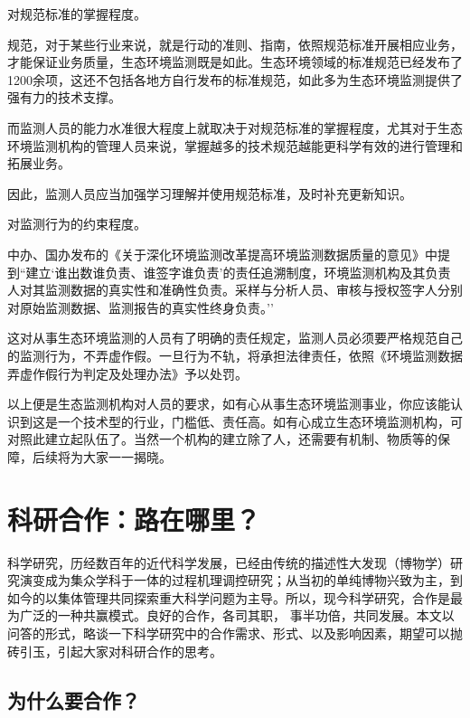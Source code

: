 \documentclass[]{book}
\begin{document}
对规范标准的掌握程度。

规范，对于某些行业来说，就是行动的准则、指南，依照规范标准开展相应业务，才能保证业务质量，生态环境监测既是如此。生态环境领域的标准规范已经发布了1200余项，这还不包括各地方自行发布的标准规范，如此多为生态环境监测提供了强有力的技术支撑。

而监测人员的能力水准很大程度上就取决于对规范标准的掌握程度，尤其对于生态环境监测机构的管理人员来说，掌握越多的技术规范越能更科学有效的进行管理和拓展业务。

因此，监测人员应当加强学习理解并使用规范标准，及时补充更新知识。

对监测行为的约束程度。

中办、国办发布的《关于深化环境监测改革提高环境监测数据质量的意见》中提到``建立`谁出数谁负责、谁签字谁负责'的责任追溯制度，环境监测机构及其负责人对其监测数据的真实性和准确性负责。采样与分析人员、审核与授权签字人分别对原始监测数据、监测报告的真实性终身负责。''

这对从事生态环境监测的人员有了明确的责任规定，监测人员必须要严格规范自己的监测行为，不弄虚作假。一旦行为不轨，将承担法律责任，依照《环境监测数据弄虚作假行为判定及处理办法》予以处罚。

以上便是生态监测机构对人员的要求，如有心从事生态环境监测事业，你应该能认识到这是一个技术型的行业，门槛低、责任高。如有心成立生态环境监测机构，可对照此建立起队伍了。当然一个机构的建立除了人，还需要有机制、物质等的保障，后续将为大家一一揭晓。

\hypertarget{ux79d1ux7814ux5408ux4f5cux8defux5728ux54eaux91cc}{%
\section{科研合作：路在哪里？}\label{ux79d1ux7814ux5408ux4f5cux8defux5728ux54eaux91cc}}

科学研究，历经数百年的近代科学发展，已经由传统的描述性大发现（博物学）研究演变成为集众学科于一体的过程机理调控研究；从当初的单纯博物兴致为主，到如今的以集体管理共同探索重大科学问题为主导。所以，现今科学研究，合作是最为广泛的一种共赢模式。良好的合作，各司其职， 事半功倍，共同发展。本文以问答的形式，略谈一下科学研究中的合作需求、形式、以及影响因素，期望可以抛砖引玉，引起大家对科研合作的思考。

\hypertarget{ux4e3aux4ec0ux4e48ux8981ux5408ux4f5c}{%
\subsection{为什么要合作？}\label{ux4e3aux4ec0ux4e48ux8981ux5408ux4f5c}}
\end{document}
